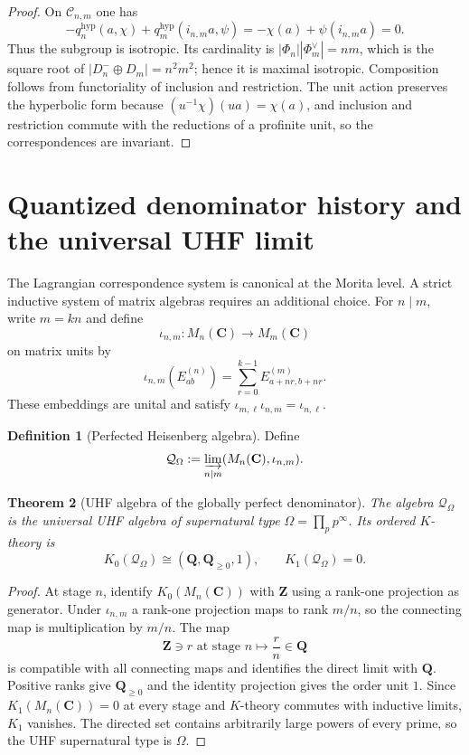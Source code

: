 \documentclass[11pt]{amsart}
\numberwithin{equation}{section}
\newtheorem{theorem}{Theorem}[section]
\theoremstyle{definition}
\newtheorem{definition}[theorem]{Definition}
\newcommand{\Z}{\mathbf Z}
\newcommand{\Q}{\mathbf Q}
\newcommand{\C}{\mathbf C}
\begin{document}
\begin{proof}
On $\mathcal C_{n,m}$ one has
\[
-q_n^{\mathrm{hyp}}(a,\chi)
+q_m^{\mathrm{hyp}}(i_{n,m}a,\psi)
=-\chi(a)+\psi(i_{n,m}a)=0.
\]
Thus the subgroup is isotropic.  Its cardinality is
$|\Phi_n||\Phi_m^\vee|=nm$, which is the square root of
$|D_n^-\oplus D_m|=n^2m^2$; hence it is maximal isotropic.
Composition follows from functoriality of inclusion and restriction.
The unit action preserves the hyperbolic form because
$(u^{-1}\chi)(ua)=\chi(a)$, and inclusion and restriction commute with
the reductions of a profinite unit, so the correspondences are invariant.
\end{proof}

\section{Quantized denominator history and the universal UHF limit}
\label{sec:uhf-history}

The Lagrangian correspondence system is canonical at the Morita level.  A
strict inductive system of matrix algebras requires an additional choice.
For $n\mid m$, write $m=kn$ and define
\[
\iota_{n,m}:M_n(\C)\longrightarrow M_m(\C)
\]
on matrix units by
\[
\boxed{
\iota_{n,m}(E_{ab}^{(n)})
=\sum_{r=0}^{k-1}E_{a+nr,b+nr}^{(m)}.
}
\]
These embeddings are unital and satisfy
$\iota_{m,\ell}\iota_{n,m}=\iota_{n,\ell}$.

\begin{definition}[Perfected Heisenberg algebra]
\label{def:perfected-uhf}
Define
\[
\mathcal Q_\Omega
:=\varinjlim_{n\mid m}(M_n(\C),\iota_{n,m}).
\]
\end{definition}

\begin{theorem}[UHF algebra of the globally perfect denominator]
\label{thm:perfected-uhf}
The algebra $\mathcal Q_\Omega$ is the universal UHF algebra of
supernatural type $\Omega=\prod_pp^\infty$.  Its ordered $K$-theory is
\[
K_0(\mathcal Q_\Omega)
\cong(\Q,\Q_{\geq0},1),
\qquad
K_1(\mathcal Q_\Omega)=0.
\]
\end{theorem}

\begin{proof}
At stage $n$, identify $K_0(M_n(\C))$ with $\Z$ using a rank-one
projection as generator.  Under $\iota_{n,m}$ a rank-one projection maps
to rank $m/n$, so the connecting map is multiplication by $m/n$.  The
map
\[
\Z\ni r\text{ at stage }n
\longmapsto\frac rn\in\Q
\]
is compatible with all connecting maps and identifies the direct limit
with $\Q$.  Positive ranks give $\Q_{\geq0}$ and the identity projection
gives the order unit $1$.  Since $K_1(M_n(\C))=0$ at every stage and
$K$-theory commutes with inductive limits, $K_1$ vanishes.  The directed
set contains arbitrarily large powers of every prime, so the UHF
supernatural type is $\Omega$.
\end{proof}
\end{document}
